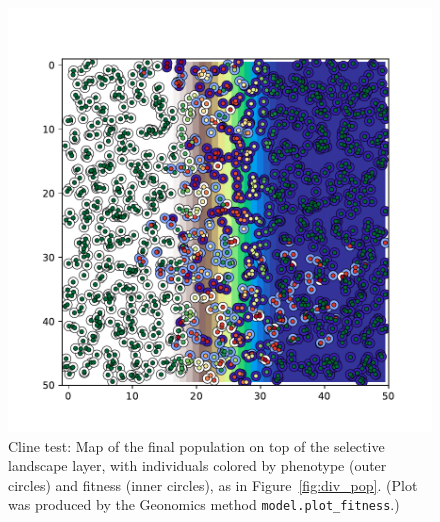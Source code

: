 ﻿\documentclass{article}
\begin{document}
\begin{figure}[!p]
        \includegraphics[width=175mm]{./img/final/CLINE_pop_plot.pdf}
        \caption{Cline test: Map of the final population
                 on top of the selective landscape layer,
                 with individuals colored by phenotype (outer circles)
                 and fitness (inner circles), as in Figure~\ref{fig:div_pop}.
                 (Plot was produced by the Geonomics method
                 \texttt{model.plot\_fitness}.)}
        \label{fig:cline_pop}
\end{figure}
\end{document}

